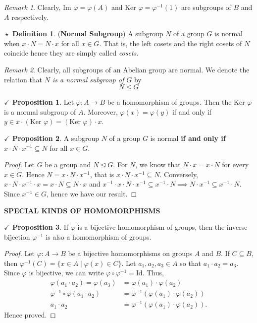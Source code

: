 \documentclass{article}
\theoremstyle{definition}
\newtheorem{definition}{$\boxed{\star}$ Definition}
\theoremstyle{remark}
\newtheorem*{remark}{Remark}
\theoremstyle{definition}
\theoremstyle{definition}
\newtheorem{proposition}{$\checkmark$ Proposition}
\theoremstyle{definition}
\theoremstyle{proof}
\newcommand{\inv}[1]{#1^{-1}}
\newcommand{\image}[0]{\text{Im }}
\newcommand{\kernel}[0]{\text{Ker }}
\newcommand{\nsg}[0]{\trianglelefteq}
\begin{document}
\begin{remark}
	Clearly, $ \image\varphi = \varphi(A) $ and $ \kernel\varphi = \inv{\varphi}(1) $ are subgroups of $ B $ and $ A $ respectively.
\end{remark}
\hrulefill
\begin{definition}
	(\textbf{Normal Subgroup}) A subgroup $ N $ of a group $ G $ is normal when $ x\cdot N = N\cdot x$ for all $ x\in G $. That is, the left cosets and the right cosets of $ N $ coincide hence they are simply called \emph{cosets}.
\end{definition}
\begin{remark}
	Clearly, all subgroups of an Abelian group are normal. We denote the relation that \emph{$ N $ is a normal subgroup of $ G $} by
	\[N \nsg G\]
\end{remark}
\hrulefill
\begin{proposition}
	Let $ \varphi : A \to B $ be a homomorphism of groups. Then the $ \kernel\varphi $ is a normal subgroup of $ A $. Moreover, $ \varphi(x) = \varphi(y) $ if and only if $ y\in x\cdot (\kernel\varphi) = (\kernel \varphi)\cdot x $.
\end{proposition}
\hrulefill
\begin{proposition}
	A subgroup $ N $ of a group $ G $ is normal \textbf{if and only if} $ x\cdot N\cdot \inv{x} \subseteq N $ for all $ x\in G $.
\end{proposition}
\begin{proof}
	Let $ G $ be a group and $ N \nsg G $. For $ N $, we know that $ N\cdot x = x\cdot N $ for every $ x\in G $. Hence $ N = x\cdot N\cdot \inv{x} $, that is $ x\cdot N\cdot \inv{x} \subseteq N $. Conversely, $ x\cdot N\cdot \inv{x}\cdot x = x\cdot N\subseteq N\cdot x $ and $ \inv{x}\cdot x \cdot N\cdot \inv{x} \subseteq \inv{x}\cdot N \implies N\cdot \inv{x} \subseteq \inv{x}\cdot N$. Since $ \inv{x}\in G $, hence we have our result.
\end{proof}
\newpage
\hrulefill
\textbf{SPECIAL KINDS OF HOMOMORPHISMS}
\hrulefill
\begin{proposition}
	If $ \varphi $ is a bijective homomorphism of groups, then the inverse bijection $ \inv{\varphi} $ is also a homomorphism of groups.
\end{proposition}
\begin{proof}
	Let $ \varphi : A\to B $ be a bijective homomorphisms on groups $ A $ and $ B $. If $ C \subseteq B $, then $ \inv{\varphi}(C) = \{x\in A \;\vert\; \varphi(x) \in C\} $. Let $ a_1,a_2,a_3 \in A $ so that $ a_1\cdot a_2 =  a_3$. Since $ \varphi $ is bijective, we can write $ \varphi \circ \inv{\varphi} = \text{Id} $. Thus,
	\begin{equation*}
		\begin{split}
			\varphi (a_1\cdot a_2) = \varphi(a_3) &= \varphi(a_1) \cdot \varphi(a_2)\\
			\inv{\varphi}\circ \varphi (a_1\cdot a_2) &= \inv{\varphi}\left( \varphi(a_1) \cdot \varphi(a_2)\right)\\
			a_1\cdot a_2 &= \inv{\varphi}\left( \varphi(a_1) \cdot \varphi(a_2)\right).
		\end{split}
	\end{equation*}
Hence proved.
\end{proof}
\end{document}
